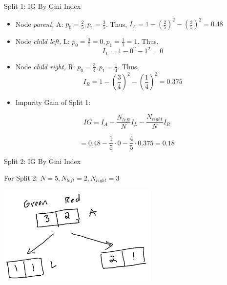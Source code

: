 \documentclass[
  ignorenonframetext,
]{beamer}
\begin{document}
\begin{frame}{Split 1: IG By Gini Index}
\protect\hypertarget{split-1-ig-by-gini-index-1}{}

\begin{itemize}
\item
  Node \emph{parent,} A: \(p_0 = \frac{2}{5}, p_1 = \frac{3}{5}\). Thus,
  \(I_{A} = 1 - (\frac{2}{5})^2-(\frac{3}{5})^2 = 0.48\)
\item
  Node \emph{child left,} L:
  \(p_0 = \frac{0}{1} = 0, p_1 = \frac{1}{1} = 1\). Thus,
  \[I_{L} = 1 -0^2-1^2 = 0\]
\item
  Node \emph{child right,} R: \(p_0 = \frac{3}{4}, p_1 = \frac{1}{4}\).
  Thus, \[I_{R} = 1-(\frac{3}{4})^2-(\frac{1}{4})^2 = 0.375\]
\item
  Impurity Gain of Split 1:
\end{itemize}

\[
IG = I_{A} - \frac{N_{left}}{N}I_{L}-\frac{N_{right}}{N}I_{R}
\]

\[ = 0.48 - \frac{1}{5} \cdot 0-\frac{4}{5} \cdot 0.375 = 0.18\]

\end{frame}

\begin{frame}{Split 2: IG By Gini Index}
\protect\hypertarget{split-2-ig-by-gini-index}{}

For Split 2: \(N = 5, N_{left} =2, N_{right} = 3\)

\includegraphics{images2/im3.png}

\end{frame}
\end{document}
